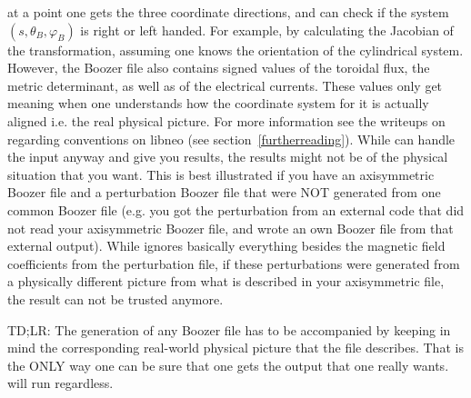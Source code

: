 \documentclass{article}
\newcommand{\vv}[1]{\texttt{\detokenize{#1}}}
\begin{document}
at a point one gets the three coordinate directions, and can check if the 
system $(s,\theta_B,\varphi_B)$ is right or left handed. For example, by calculating
the Jacobian of the transformation, assuming one knows the orientation of the cylindrical system. 
However, the Boozer file also contains signed values of the toroidal flux, 
the metric determinant, as well as of the electrical currents. These values 
only get meaning when one understands how the coordinate system for it is 
actually aligned i.e. the real physical picture. For more information see the 
writeups on regarding conventions on libneo (see section~\ref{furtherreading}). 
While \vv{NEO-2} can handle the input anyway and give you 
results, the results might not be of the physical situation that you want. 
This is best illustrated if you have an axisymmetric Boozer file and a 
perturbation Boozer file that were NOT generated from one common Boozer 
file (e.g. you got the perturbation from an external code that did not 
read your axisymmetric Boozer file, and wrote an own Boozer file from 
that external output). While \vv{NEO-2} ignores basically everything besides 
the magnetic field coefficients from the perturbation file, if these 
perturbations were generated from a physically different picture from
what is described in your axisymmetric file, the result can not be trusted anymore.

TD;LR: The generation of any Boozer file has to be accompanied by keeping in mind the 
corresponding real-world physical picture that the file describes. That is the ONLY way one can be
sure that one gets the output that one really wants. \vv{NEO-2} will run regardless.

\end{document}
